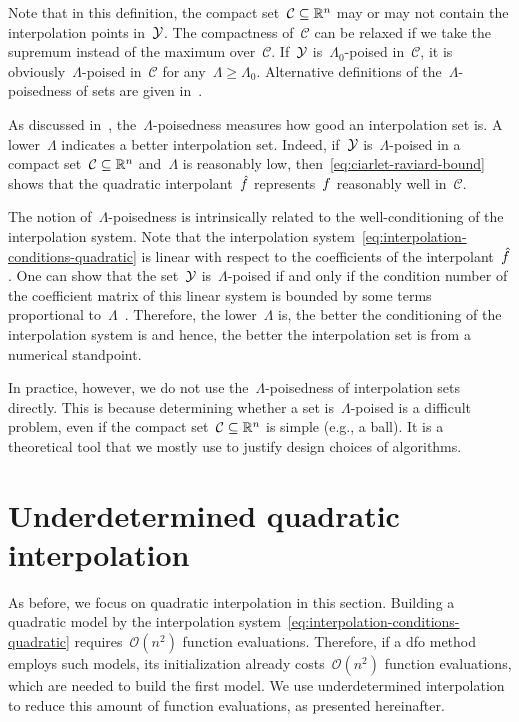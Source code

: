 Note that in this definition, the compact set~$\mathcal{C} \subseteq \mathbb{R}^n$ may or may not contain the interpolation points in~$\xpt$.
The compactness of~$\mathcal{C}$ can be relaxed if we take the supremum instead of the maximum over~$\mathcal{C}$.
If~$\xpt$ is~$\Lambda_0$-poised in~$\mathcal{C}$, it is obviously~$\Lambda$-poised in~$\mathcal{C}$ for any~$\Lambda \ge \Lambda_0$.
Alternative definitions of the~$\Lambda$-poisedness of sets are given in~\cite[\S~3.3]{Conn_Scheinberg_Vicente_2009b}.

As discussed in~\cite[\S~3.3]{Conn_Scheinberg_Vicente_2009b}, the~$\Lambda$-poisedness measures how good an interpolation set is.
A lower~$\Lambda$ indicates a better interpolation set.
Indeed, if~$\xpt$ is~$\Lambda$-poised in a compact set~$\mathcal{C} \subseteq \mathbb{R}^n$ and~$\Lambda$ is reasonably low, then~\cref{eq:ciarlet-raviard-bound} shows that the quadratic interpolant~$\objm$ represents~$f$ reasonably well in~$\mathcal{C}$.

The notion of~$\Lambda$-poisedness is intrinsically related to the well-conditioning of the interpolation system.
Note that the interpolation system~\cref{eq:interpolation-conditions-quadratic} is linear with respect to the coefficients of the interpolant~$\objm$.
One can show that the set~$\xpt$ is~$\Lambda$-poised if and only if the condition number of the coefficient matrix of this linear system is bounded by some terms proportional to~$\Lambda$~\cite[Thm.~3.14]{Conn_Scheinberg_Vicente_2009b}.
Therefore, the lower~$\Lambda$ is, the better the conditioning of the interpolation system is and hence, the better the interpolation set is from a numerical standpoint.

In practice, however, we do not use the~$\Lambda$-poisedness of interpolation sets directly.
This is because determining whether a set is~$\Lambda$-poised is a difficult problem, even if the compact set~$\mathcal{C} \subseteq \mathbb{R}^n$ is simple (e.g., a ball).
It is a theoretical tool that we mostly use to justify design choices of algorithms.

\section{Underdetermined quadratic interpolation}
\label{sec:underdetermined-interpolation}

As before, we focus on quadratic interpolation in this section.
Building a quadratic model by the interpolation system~\cref{eq:interpolation-conditions-quadratic} requires~$\mathcal{O}(n^2)$ function evaluations.
Therefore, if a \gls{dfo} method employs such models, its initialization already costs~$\mathcal{O}(n^2)$ function evaluations, which are needed to build the first model.
We use underdetermined interpolation to reduce this amount of function evaluations, as presented hereinafter.

